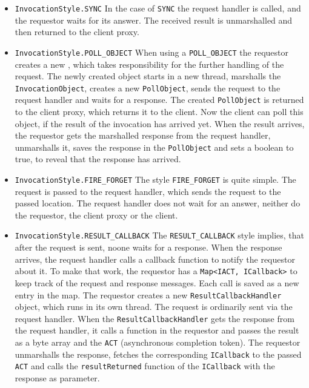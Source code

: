 \begin{itemize}
	\item \texttt{InvocationStyle.SYNC}
	In the case of \texttt{SYNC} the request handler is called, and the requestor waits for its answer. The received result is unmarshalled and then returned to the client proxy. 	
	\item \texttt{InvocationStyle.POLL_OBJECT}
	When using a \texttt{POLL_OBJECT} the requestor creates a new , which takes responsibility for the further handling of the request. The newly created object starts in a new thread, marshalls the \texttt{InvocationObject}, creates a new \texttt{PollObject}, sends the request to the request handler and waits for a response. The created \texttt{PollObject} is returned to the client proxy, which returns it to the client. Now the client can poll this object, if the result of the invocation has arrived yet. When the result arrives, the requestor gets the marshalled response from the request handler, unmarshalls it, saves the response in the \texttt{PollObject} and sets a boolean to true, to reveal that the response has arrived.
	\item \texttt{InvocationStyle.FIRE_FORGET}
	The style \texttt{FIRE_FORGET} is quite simple. The request is passed to the request handler, which sends the request to the passed location. The request handler does not wait for an answer, neither do the requestor, the client proxy or the client.
	\item \texttt{InvocationStyle.RESULT_CALLBACK}
	The \texttt{RESULT_CALLBACK} style implies, that after the request is sent, noone waits for a response. When the response arrives, the request handler calls a callback function to notify the requestor about it. To make that work, the requestor has a \texttt{Map<IACT, ICallback>} to keep track of the request and response messages. Each call is saved as a new entry in the map. The requestor creates a new \texttt{ResultCallbackHandler} object, which runs in its own thread. The request is ordinarily sent via the request handler. When the \texttt{ResultCallbackHandler} gets the response from the request handler, it calls a function in the requestor and passes the result as a byte array and the \texttt{ACT} (asynchronous completion token). The requestor unmarshalls the response, fetches the corresponding \texttt{ICallback} to the passed \texttt{ACT} and calls the \texttt{resultReturned} function of the \texttt{ICallback} with the response as parameter.
\end{itemize}


